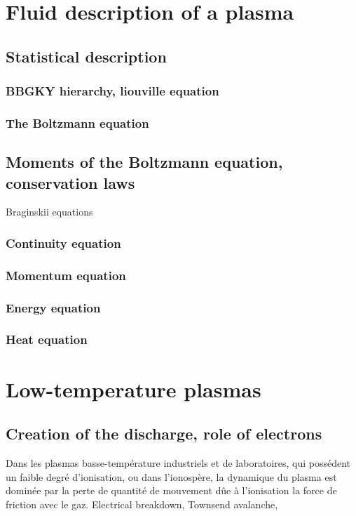 	\section{Fluid description of a plasma}
		\subsection{Statistical description}
			\subsubsection{BBGKY hierarchy, liouville equation}
			\subsubsection{The Boltzmann equation}
		\subsection{Moments of the Boltzmann equation, conservation laws}
			Braginskii equations
			\subsubsection{Continuity equation}
			\subsubsection{Momentum equation}
			\subsubsection{Energy equation}
			\subsubsection{Heat equation}
	\section{Low-temperature plasmas}
		\subsection{Creation of the discharge, role of electrons}
		Dans les plasmas basse-température industriels et de laboratoires, qui possédent
			un faible degré d'ionisation, ou dans l'ionospère, la dynamique du plasma est dominée par
			la perte de quantité de mouvement dûe à l'ionisation la force de friction avec le gaz.
		Electrical breakdown, Townsend avalanche, 
